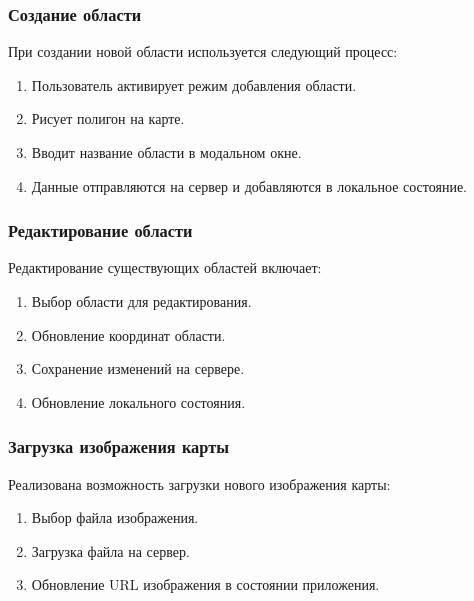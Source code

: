 \subsubsection{Создание области}
При создании новой области используется следующий процесс:
\begin{enumerate}
    \item Пользователь активирует режим добавления области.
    \item Рисует полигон на карте.
    \item Вводит название области в модальном окне.
    \item Данные отправляются на сервер и добавляются в локальное состояние.
\end{enumerate}

\subsubsection{Редактирование области}
Редактирование существующих областей включает:
\begin{enumerate}
    \item Выбор области для редактирования.
    \item Обновление координат области.
    \item Сохранение изменений на сервере.
    \item Обновление локального состояния.
\end{enumerate}

\subsubsection{Загрузка изображения карты}

Реализована возможность загрузки нового изображения карты:
\begin{enumerate}
    \item Выбор файла изображения.
    \item Загрузка файла на сервер.
    \item Обновление URL изображения в состоянии приложения.
\end{enumerate}
